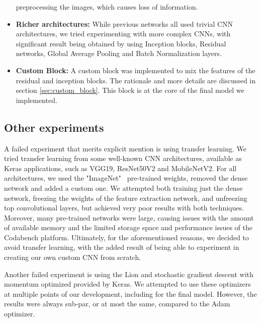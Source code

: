 \documentclass[11pt]{article}
\begin{document}
\begin{multicols}{2}
\begin{itemize}
                  preprocessing the images, which causes loss of information.
            \item \textbf{Richer architectures:} While previous networks all used trivial 
                  CNN architectures, we tried experimenting with more complex CNNs,
                  with significant result being obtained by using Inception blocks,
                  Residual networks, Global Average Pooling\cite{Lin2013NetworkIN} and Batch Normalization layers\cite{pmlr-v37-ioffe15}.
            \item \textbf{Custom Block:} A custom block was implemented to mix the 
                  features of the residual and inception blocks. The rationale and more
                  details are discussed in section \ref{sec:custom_block}. This block 
                  is at the core of the final model we implemented.
      \end{itemize}

      \subsection{Other experiments}

      A failed experiment that merits explicit mention is using transfer learning\cite{TransferLearning}.
      We tried transfer learning from some well-known CNN architectures, available
      as Keras applications, such as VGG19, ResNet50V2 and MobileNetV2. For all
      architectures, we used the "ImageNet"~\cite{ImageNet} pre-trained weights, removed the dense
      network and added a custom one. We attempted both training just the dense
      network, freezing the weights of the feature extraction network, and unfreezing
      top convolutional layers, but achieved very poor results with both techniques.
      Moreover, many pre-trained networks were large, causing issues with the amount
      of available memory and the limited storage space and performance issues of the
      Codabench platform. Ultimately, for the aforementioned reasons, we decided to 
      avoid transfer learning, with the added result of being able to experiment in
      creating our own custom CNN from scratch.

      Another failed experiment is using the Lion and stochastic gradient descent
      with momentum optimized provided by Keras. We attempted to use these optimizers
      at multiple points of our development, including for the final model. However,
      the results were always sub-par, or at most the same, compared to the Adam\cite{Kingma2014AdamAM} 
      optimizer.


\end{multicols}
\end{document}

